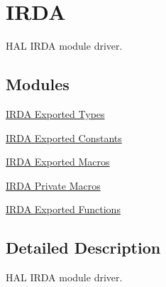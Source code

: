 \hypertarget{group___i_r_d_a}{}\section{I\+R\+DA}
\label{group___i_r_d_a}


H\+AL I\+R\+DA module driver.  


\subsection*{Modules}
\begin{DoxyCompactItemize}
\item 
\hyperlink{group___i_r_d_a___exported___types}{I\+R\+D\+A Exported Types}
\item 
\hyperlink{group___i_r_d_a___exported___constants}{I\+R\+D\+A Exported Constants}
\item 
\hyperlink{group___i_r_d_a___exported___macros}{I\+R\+D\+A Exported Macros}
\item 
\hyperlink{group___i_r_d_a___private___macros}{I\+R\+D\+A Private Macros}
\item 
\hyperlink{group___i_r_d_a___exported___functions}{I\+R\+D\+A Exported Functions}
\end{DoxyCompactItemize}


\subsection{Detailed Description}
H\+AL I\+R\+DA module driver. 

